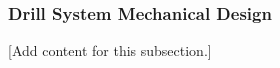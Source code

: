 
\subsubsection{Drill System Mechanical Design}
\label{subsubsec:design_3_6_drill_system_mechanical_design}

[Add content for this subsection.]
